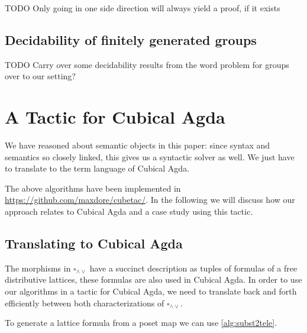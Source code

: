 \documentclass{llncs}
\newcommand{\todo}[1]{
  \begin{tcolorbox}
    TODO {#1} 
  \end{tcolorbox}
}
\newcommand{\join}{\wedge}
\newcommand{\meet}{\vee}
\newcommand{\dedekind}{\square_{\join \meet}}
\begin{document}
\begin{proposition}
\todo{Only going in one side direction will always yield a proof, if it exists}

\subsection{Decidability of finitely generated groups}

\todo{Carry over some decidability results from the word problem for groups over
to our setting?}





\section{A Tactic for Cubical Agda}
\label{sec:cubicalagda}

We have reasoned about semantic objects in this paper: since syntax and semantics so
closely linked, this gives us a syntactic solver as well. We just have to
translate to the term language of Cubical Agda.

The above algorithms have been implemented in
\url{https://github.com/maxdore/cubetac/}. In the following we will discuss how
our approach relates to Cubical Agda and a case study using this tactic.




\subsection{Translating to Cubical Agda}

The morphisms in $\dedekind$ have a succinct description as tuples of formulas
of a free distributive lattices, these formulas are also used in Cubical Agda.
In order to use our algorithms in a tactic for Cubical Agda, we need to
translate back and forth efficiently between both characterizations of $\dedekind$.

To generate a lattice formula from a poset map we can use \autoref{alg:subst2tele}.


\end{proposition}
\end{document}
